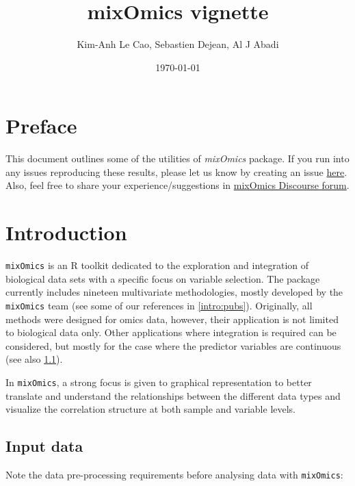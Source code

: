\documentclass[]{book}
\title{mixOmics vignette}
\author{Kim-Anh Le Cao, Sebastien Dejean, Al J Abadi}
\date{\today}
\begin{document}
\maketitle

{
\setcounter{tocdepth}{1}
\tableofcontents
}
\hypertarget{preface}{%
\chapter*{Preface}\label{preface}}

This document outlines some of the utilities of \emph{mixOmics} package. If you run into any issues reproducing these results, please let us know by creating an issue \href{https://github.com/mixOmicsTeam/Bookdown/issues}{here}. Also, feel free to share your experience/suggestions in \href{https://mixomics-users.discourse.group/}{mixOmics Discourse forum}.

\hypertarget{intro}{%
\chapter{Introduction}\label{intro}}

\texttt{mixOmics} is an R toolkit dedicated to the exploration and integration of biological data sets with a specific focus on variable selection. The package currently includes nineteen multivariate methodologies, mostly developed by the \texttt{mixOmics} team (see some of our references in \ref{intro:pubs}). Originally, all methods were designed for omics data, however, their application is not limited to biological data only. Other applications where integration is required can be considered, but mostly for the case where the predictor variables are continuous (see also \ref{intro:datatypes}).

In \texttt{mixOmics}, a strong focus is given to graphical representation to better translate and understand the relationships between the different data types and visualize the correlation structure at both sample and variable levels.

\hypertarget{intro:datatypes}{%
\section{Input data}\label{intro:datatypes}}

Note the data pre-processing requirements before analysing data with \texttt{mixOmics}:
\end{document}
